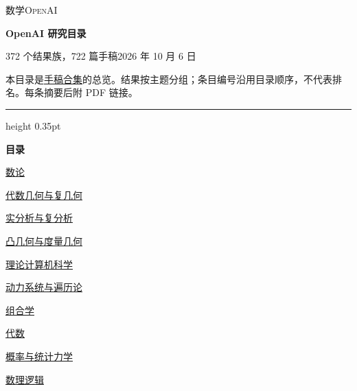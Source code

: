\documentclass[11pt,a4paper]{article}
\begin{document}
\thispagestyle{firstpage}
{\small\scshape 数学\hfill OpenAI\par}
\vspace{5pt}
{\LARGE\bfseries OpenAI 研究目录\par}
\vspace{4pt}
{\small 372 个结果族，722 篇手稿\hfill 2026 年 10 月 6 日\par}
\vspace{7pt}
{\small 本目录是\href{https://github.com/openai/math}{手稿合集}的总览。结果按主题分组；条目编号沿用目录顺序，不代表排名。每条摘要后附 PDF 链接。\par}
\vspace{8pt}\hrule height 0.35pt\vspace{5pt}

{\large\bfseries 目录\par}
\vspace{7pt}
\noindent\hyperlink{subject1}{数论}\nobreak\hfill\pageref*{subject1}\par\vspace{5pt}
\noindent\hyperlink{subject3}{代数几何与复几何}\nobreak\hfill\pageref*{subject3}\par\vspace{5pt}
\noindent\hyperlink{subject10}{实分析与复分析}\nobreak\hfill\pageref*{subject10}\par\vspace{5pt}
\noindent\hyperlink{subject8}{凸几何与度量几何}\nobreak\hfill\pageref*{subject8}\par\vspace{5pt}
\noindent\hyperlink{subject14}{理论计算机科学}\nobreak\hfill\pageref*{subject14}\par\vspace{5pt}
\noindent\hyperlink{subject12}{动力系统与遍历论}\nobreak\hfill\pageref*{subject12}\par\vspace{5pt}
\noindent\hyperlink{subject13}{组合学}\nobreak\hfill\pageref*{subject13}\par\vspace{5pt}
\noindent\hyperlink{subject2}{代数}\nobreak\hfill\pageref*{subject2}\par\vspace{5pt}
\noindent\hyperlink{subject15}{概率与统计力学}\nobreak\hfill\pageref*{subject15}\par\vspace{5pt}
\noindent\hyperlink{subject6}{数理逻辑}\nobreak\hfill\pageref*{subject6}\par\vspace{5pt}
\end{document}
